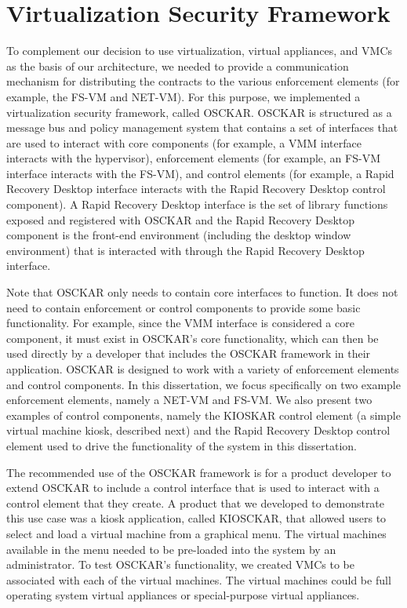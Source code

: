 \section{Virtualization Security Framework}

To complement our decision to use virtualization, virtual appliances, and VMCs as the basis of our architecture, we needed to provide a communication mechanism for distributing the contracts to the various enforcement elements (for example, the FS-VM and NET-VM). For this purpose, we implemented a virtualization security framework, called OSCKAR. OSCKAR is structured as a message bus and policy management system that contains a set of interfaces that are used to interact with core components (for example, a VMM interface interacts with the hypervisor), enforcement elements (for example, an FS-VM interface interacts with the FS-VM), and control elements (for example, a Rapid Recovery Desktop interface interacts with the Rapid Recovery Desktop control component). A Rapid Recovery Desktop interface is the set of library functions exposed and registered with OSCKAR and the Rapid Recovery Desktop component is the front-end environment (including the desktop window environment) that is interacted with through the Rapid Recovery Desktop interface.

Note that OSCKAR only needs to contain core interfaces to function. It does not need to contain enforcement or control components to provide some basic functionality. For example, since the VMM interface is considered a core component, it must exist in OSCKAR's core functionality, which can then be used directly by a developer that includes the OSCKAR framework in their application. OSCKAR is designed to work with a variety of enforcement elements and control components. In this dissertation, we focus specifically on two example enforcement elements, namely a NET-VM and FS-VM. We also present two examples of control components, namely the KIOSKAR control element (a simple virtual machine kiosk, described next) and the Rapid Recovery Desktop control element used to drive the functionality of the system in this dissertation.

The recommended use of the OSCKAR framework is for a product developer to extend OSCKAR to include a control interface that is used to interact with a control element that they create. A product that we developed to demonstrate this use case was a kiosk application, called KIOSCKAR, that allowed users to select and load a virtual machine from a graphical menu. The virtual machines available in the menu needed to be pre-loaded into the system by an administrator. To test OSCKAR's functionality, we created VMCs to be associated with each of the virtual machines. The virtual machines could be full operating system virtual appliances or special-purpose virtual appliances.

